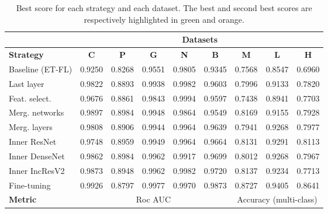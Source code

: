 \begin{table*}
	\center
    \small
    \begin{tabular}{|l||c|c|c|c|c||c|c|c|}   
      \hline 
      & \multicolumn{8}{c|}{\textbf{Datasets}} \\
      \hline 
      \textbf{Strategy} & \textbf{C} & \textbf{P} & \textbf{G} & \textbf{N} & \textbf{B} & \textbf{M} & \textbf{L} & \textbf{H} \\
      \hline
      Baseline (ET-FL)      & 0.9250 & 0.8268 & 0.9551 & 0.9805	& 0.9345 & 0.7568 & 0.8547 & 0.6960 \\
      Last layer    & 0.9822 & 0.8893 & 0.9938 & \cellcolor{Dandelion}0.9982 & 0.9603 & 0.7996 & 0.9133	& 0.7820 \\
      Feat. select.	& 0.9676	& 0.8861	& 0.9843	& \cellcolor{LimeGreen}0.9994	& 0.9597	& 0.7438	& 0.8941	& 0.7703 \\
      Merg. networks	& \cellcolor{Dandelion}0.9897	& \cellcolor{LimeGreen}0.8984	& 0.9948	& 0.9864	& 0.9549	& \cellcolor{Dandelion}0.8169	& 0.9155	& 0.7928 \\
      Merg. layers	& 0.9808	& 0.8906	& 0.9944	& 0.9964	& 0.9639	& 0.7941	& 0.9268	& 0.7977 \\
      Inner ResNet	& 0.9748	& \cellcolor{Dandelion}0.8959	& 0.9949	& 0.9964	& 0.9664	& 0.8131	& \cellcolor{Dandelion}0.9291	& \cellcolor{Dandelion}0.8113 \\
      Inner DenseNet	& 0.9862	& \cellcolor{LimeGreen}0.8984	& \cellcolor{Dandelion}0.9962	& 0.9917	& 0.9699	& 0.8012	& 0.9268	& 0.7967 \\
      Inner IncResV2	& 0.9873	& 0.8948	& \cellcolor{Dandelion}0.9962	& \cellcolor{Dandelion}0.9982	& \cellcolor{Dandelion}0.9720	& 0.8137	& 0.9234	& 0.7713 \\
       Fine-tuning		& \cellcolor{LimeGreen}0.9926	& 0.8797	& \cellcolor{LimeGreen}0.9977	& 0.9970	& \cellcolor{LimeGreen}0.9873	& \cellcolor{LimeGreen}0.8727	& \cellcolor{LimeGreen}0.9405	& \cellcolor{LimeGreen}0.8641 \\
      \hline
      \textbf{Metric} & \multicolumn{5}{c||}{Roc AUC} & \multicolumn{3}{c|}{Accuracy (multi-class)} \\
      \hline
	\end{tabular}
      \caption{Best score for each strategy and each dataset. The best and second best scores are respectively highlighted in green and orange.}
    \label{tab:comp:res_best_scores_per_strategy}
\end{table*}



